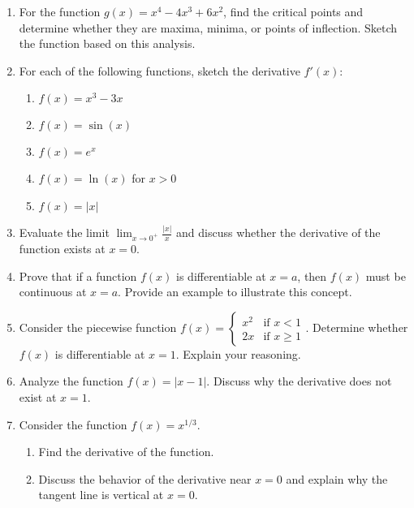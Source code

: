 \documentclass[12pt]{article}
\begin{document}
\begin{enumerate}[itemsep=20pt]
    \item For the function \( g(x) = x^4 - 4x^3 + 6x^2 \), find the critical points and determine whether they are maxima, minima, or points of inflection. Sketch the function based on this analysis.

    \item For each of the following functions, sketch the derivative \( f'(x) \):
    \begin{enumerate}[label=(\alph*), itemsep=10pt]
        \item \( f(x) = x^3 - 3x \)
        \item \( f(x) = \sin(x) \)
        \item \( f(x) = e^x \)
        \item \( f(x) = \ln(x) \) for \( x > 0 \)
        \item \( f(x) = |x| \)
    \end{enumerate}

    \item Evaluate the limit \( \lim_{x \to 0^+} \frac{|x|}{x} \) and discuss whether the derivative of the function exists at \( x = 0 \).

    \item Prove that if a function \( f(x) \) is differentiable at \( x = a \), then \( f(x) \) must be continuous at \( x = a \). Provide an example to illustrate this concept.

    \item Consider the piecewise function \( f(x) = 
    \begin{cases} 
    x^2 & \text{if } x < 1 \\
    2x & \text{if } x \geq 1 
    \end{cases} \).
    Determine whether \( f(x) \) is differentiable at \( x = 1 \). Explain your reasoning.

    \item Analyze the function \( f(x) = |x - 1| \). Discuss why the derivative does not exist at \( x = 1 \).

    \item Consider the function \( f(x) = x^{1/3} \).
    \begin{enumerate}[label=(\alph*), itemsep=10pt]
        \item Find the derivative of the function.
        \item Discuss the behavior of the derivative near \( x = 0 \) and explain why the tangent line is vertical at \( x = 0 \).
    \end{enumerate}


\end{enumerate}
\end{document}
